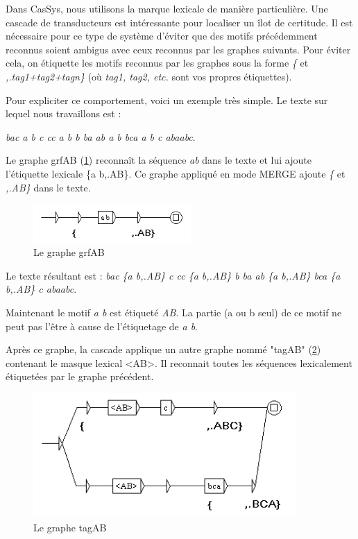 \bigskip
\noindent Dans CasSys, nous utilisons la marque lexicale de manière particulière. Une cascade de
transducteurs est intéressante pour localiser un îlot de certitude. Il est nécessaire pour ce type
de système d'éviter que des motifs précédemment reconnus soient ambigus avec ceux reconnus par les
graphes suivants. Pour éviter cela, on étiquette les motifs reconnus par les graphes sous la forme
\emph{\{} et \emph{,.tag1+tag2+tagn\}} (où \emph{tag1, tag2, etc.} sont vos propres étiquettes).

\bigskip
\noindent Pour expliciter ce comportement, voici un exemple très simple. Le texte sur lequel nous
travaillons est :

\emph{bac a b c cc a b b ba ab a b bca a b c abaabc}.

\bigskip
\noindent Le graphe grfAB (\ref{fig13-05}) reconnaît la séquence \emph{ab} dans le texte et lui
ajoute l'étiquette lexicale \{a b,.AB\}. Ce graphe appliqué en mode MERGE ajoute \emph{\{ } et
 \emph{,.AB\}} dans le texte.

\begin{figure}[!htb]
  \centering
  \includegraphics[width=6cm]{resources/img/fig13-05.png}
  \caption{Le graphe grfAB}
  \label{fig13-05}
\end{figure}

\bigskip
\noindent Le texte résultant est : \emph{bac \{a b,.AB\} c cc \{a b,.AB\} b ba ab \{a b,.AB\} bca
\{a b,.AB\} c abaabc}.

\bigskip
\noindent Maintenant le motif \emph{a b} est étiqueté \emph{AB}. La partie (a ou b seul) de ce
motif ne peut pas l'être à cause de l'étiquetage de \emph{a b}.

\bigskip
\noindent Après ce graphe, la cascade applique un autre graphe nommé "tagAB" (\ref{fig13-06})
contenant le masque lexical <AB>. Il reconnait toutes les séquences lexicalement étiquetées par le
graphe précédent.

\begin{figure}[!htb]
  \centering
  \includegraphics[width=10cm]{resources/img/fig13-06.png}
  \caption{Le graphe tagAB}
  \label{fig13-06}
\end{figure}

